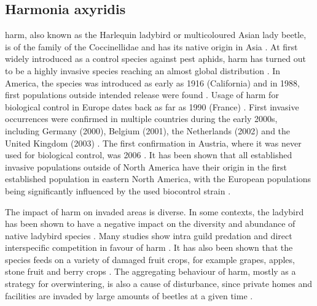 \documentclass[12pt,a4paper]{article}
\begin{document}
\subsection{Harmonia axyridis}
\gls{harm}, also known as the Harlequin ladybird or multicoloured Asian lady beetle, is of the family of the Coccinellidae and has its native origin in Asia \autocite{roy2016harmonia}.
At first widely introduced as a control species against pest aphids, \gls{harm} has turned out to be a highly invasive species reaching an almost global distribution \autocite{brown2008harmonia}.
In America, the species was introduced as early as 1916 (California) and in 1988, first populations outside intended release were found \autocite{chapin1991harmoniaNA}.
Usage of \gls{harm} for biological control in Europe dates back as far as 1990 (France) \autocite{coutanceau2006harmoniaFR}.
First invasive occurrences were confirmed in multiple countries during the early 2000s, including Germany (2000), Belgium (2001), the Netherlands (2002) and the United Kingdom (2003) \autocite{roy2016harmonia}.
The first confirmation in Austria, where it was never used for biological control, was 2006 \autocite{rabitsch2006harmoniaAT}.
It has been shown that all established invasive populations outside of North America have their origin in the first established population in eastern North America, with the European populations being significantly influenced by the used biocontrol strain \autocite{lombaert2010harmoniabridgehead}.

The impact of \gls{harm} on invaded areas is diverse.
In some contexts, the ladybird has been shown to have a negative impact on the diversity and abundance of native ladybird species \autocite{roy2016harmonia}.
Many studies show intra guild predation and direct interspecific competition in favour of \gls{harm} \autocite{pell2008harmoniaIGP}.
It has also been shown that the species feeds on a variety of damaged fruit crops, for example grapes, apples, stone fruit and berry crops \autocite{koch2004harmoniafoodcrop}.
The aggregating behaviour of \gls{harm}, mostly as a strategy for overwintering, is also a cause of disturbance, since private homes and facilities are invaded by large amounts of beetles at a given time \autocite{nalepa2005harmoniahomes}.

\newpage
\printbibliography[]

\end{document}

